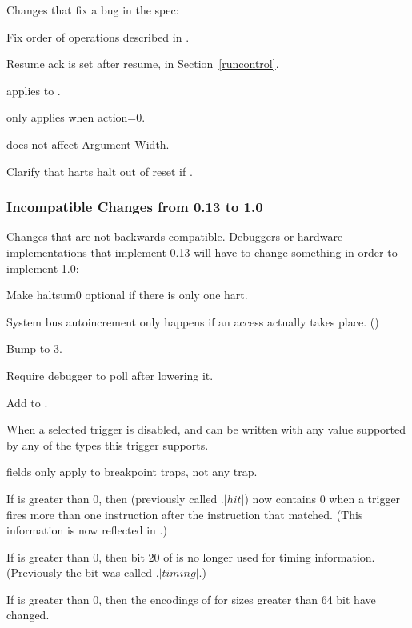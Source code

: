 \begin{steps}{Changes that fix a bug in the spec:}
    \item Fix order of operations described in \RdmSbdataZero. 
    \item Resume ack is set after resume, in Section~\ref{runcontrol}. 
    \item \FcsrTextraThirtytwoSselect applies to \FcsrTextraThirtytwoSvalue. 
    \item \FcsrTcontrolMte only applies when action=0. 
    \item \FacAccessmemoryAamsize does not affect Argument Width. 
    \item Clarify that harts halt out of reset if . 
\end{steps}

\subsubsection{Incompatible Changes from 0.13 to 1.0}

\begin{steps}{Changes that are not backwards-compatible. Debuggers or
hardware implementations that implement 0.13 will have to change something in
order to implement 1.0:}
    \item Make haltsum0 optional if there is only one hart. 
    \item System bus autoincrement only happens if an access actually
    takes place. (\RdmSbdataZero) 
    \item Bump \FdmDmstatusVersion to 3. 
    \item Require debugger to poll \FdmDmcontrolDmactive after lowering it. 
    \item Add \FcsrIcountPending to \RcsrIcount. 
    \item When a selected trigger is disabled, \RcsrTdataTwo and \RcsrTdataThree
    can be written with any value supported by any of the types this trigger
    supports. 
    \item \RcsrTcontrol fields only apply to breakpoint traps, not any trap. 
    \item If \FcsrTinfoVersion is greater than 0, then \FcsrMcontrolSixHitZero
        (previously called \RcsrMcontrolSix.$|hit|$) now contains 0 when a trigger
        fires more than one instruction after the instruction that matched.  (This
        information is now reflected in \FcsrMcontrolSixHitOne.) 
    \item If \FcsrTinfoVersion is greater than 0, then bit 20 of
        \RcsrMcontrolSix is no longer used for timing information. (Previously
        the bit was called \RcsrMcontrolSix.$|timing|$.) 
    \item If \FcsrTinfoVersion is greater than 0, then the encodings of
        \FcsrMcontrolSixSize for sizes greater than 64 bit have changed. 
\end{steps}

